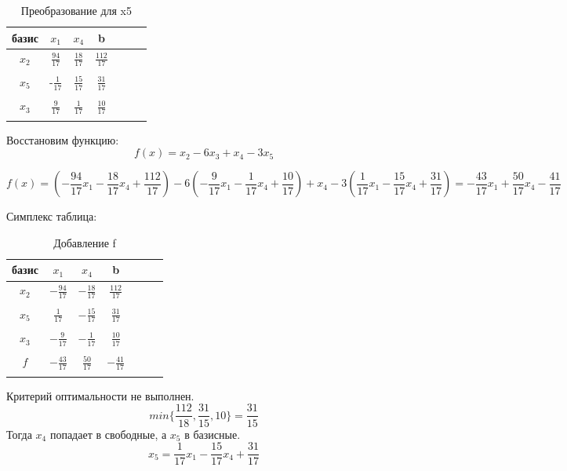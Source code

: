\documentclass{article}
\begin{document}
\begin{table}[H]
    \centering
    \caption{Преобразование для x5}
    \begin{tabular}{|c|c|c|c|c|c|c|}
    \hline
        базис  & $x_1$ & $x_4$ & b \\ \hline
        $x_2$ 	&$\frac{94}{17}$&	$\frac{18}{17}$	&$\frac{112}{17}$ \\
        &&& \\
        $x_5$ 	&-$\frac{1}{17}$	&$\frac{15}{17}$&	$\frac{31}{17}$ \\
        &&& \\
        $x_3$  	&$\frac{9}{17}$	&$\frac{1}{17}$	&$\frac{10}{17}$ \\
        &&& \\ \hline
    \end{tabular}
\end{table}

Восстановим функцию:
\[f(x) = x_2-6x_3+x_4-3x_5\]

\[f(x) = (-\frac{94}{17}x_1 -\frac{18}{17}x_4 +\frac{112}{17} )-6
(-\frac{9}{17}x_1-	\frac{1}{17}x_4+	\frac{10}{17})+x_4
-3(\frac{1}{17}x_1	-\frac{15}{17}x_4+	\frac{31}{17})=
-\frac{43}{17}x_1 + \frac{50}{17}x_4 - \frac{41}{17}\]

Симплекс таблица:

\begin{table}[H]
    \centering
    \caption{Добавление f}
    \begin{tabular}{|c|c|c|c|c|c|c|}
    \hline
        базис  & $x_1$ & $x_4$ & b \\ \hline
        $x_2$ 	&$-\frac{94}{17}$&	$-\frac{18}{17}$	&$\frac{112}{17}$ \\
        &&& \\
        $x_5$ 	&$\frac{1}{17}$	&$-\frac{15}{17}$&	$\frac{31}{17}$ \\
        &&& \\
        $x_3$  	&$-\frac{9}{17}$	&$-\frac{1}{17}$	&$\frac{10}{17}$ \\
        &&& \\
        $f$  	&$-\frac{43}{17}$	&$\frac{50}{17}$	&$- \frac{41}{17}$ \\
        &&& \\ \hline
    \end{tabular}
\end{table}
Критерий оптимальности не выполнен.
\[min\{\frac{112}{18}, \frac{31}{15}, 10\} = \frac{31}{15}\]
Тогда $x_4$ попадает в свободные, а $x_5$ в базисные.
\[x_5 = \frac{1}{17}x_1 - \frac{15}{17}x_4 + \frac{31}{17}\]
\end{document}
